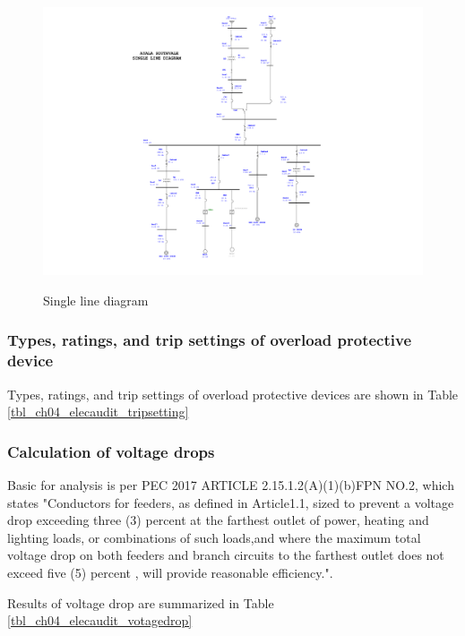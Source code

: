 \begin{figure}
	\includegraphics[width=\textwidth]{figures/fig_ch04_elecaudit_SLD_with_VFD.pdf} \\
	\caption{Single line diagram}
	\label{fig_ch04_elecaudit_SLD_with_VFD} 
\end{figure}
\subsubsection{Types, ratings, and trip settings of overload protective device}
Types, ratings, and trip settings of overload protective devices are shown in Table \ref{tbl_ch04_elecaudit_tripsetting}





\subsubsection{Calculation of voltage drops }
Basic for analysis is per PEC 2017 ARTICLE 2.15.1.2(A)(1)(b)FPN NO.2, which states "Conductors  for feeders, as defined in Article1.1, sized to prevent a voltage drop exceeding three 
(3) percent at the farthest outlet of power, heating and lighting loads, or combinations of such
loads,and where the maximum total voltage drop on both feeders and branch circuits to the  
farthest outlet does not exceed five (5) percent , will provide reasonable efficiency.".

Results of voltage drop are summarized in Table \ref{tbl_ch04_elecaudit_votagedrop}



